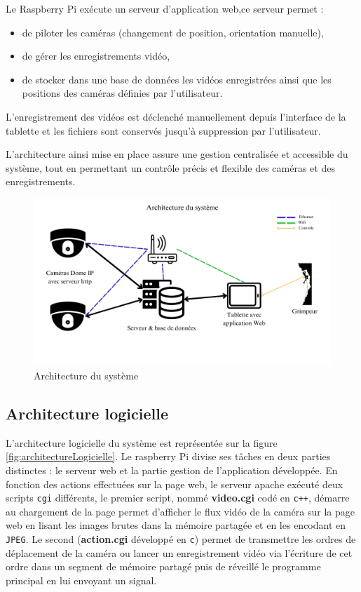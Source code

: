 \documentclass[a4paper, 11pt, french]{article}
\begin{document}
Le Raspberry Pi exécute un serveur d’application web,ce serveur permet :
\begin{itemize}
    \item de piloter les caméras (changement de position, orientation manuelle),
    \item de gérer les enregistrements vidéo,
    \item de stocker dans une base de données les vidéos enregistrées ainsi que les positions des caméras définies par l’utilisateur.
\end{itemize}

L’enregistrement des vidéos est déclenché manuellement depuis l’interface de la tablette et les fichiers sont conservés jusqu’à suppression par l’utilisateur.

L’architecture ainsi mise en place assure une gestion centralisée et accessible du système, tout en permettant un contrôle précis et flexible des caméras et des enregistrements.


\begin{figure}[!ht]
  \centering
  \includegraphics[width=\textwidth]{architectureMaterielle.png}
  \caption{Architecture du système}
  \label{fig:architecture}
\end{figure}

\subsection{Architecture logicielle}
L'architecture logicielle du système est représentée sur la figure \ref{fig:architectureLogicielle}. Le raspberry Pi divise ses tâches en deux parties distinctes : le serveur web et la partie gestion de l'application développée. En fonction des actions effectuées sur la page web, le serveur apache exécuté deux scripts \texttt{cgi} différents, le premier script, nommé \textbf{video.cgi} codé en \texttt{c++}, démarre au chargement de la page permet d'afficher le flux vidéo de la caméra sur la page web en lisant les images brutes dans la mémoire partagée et en les encodant en \texttt{JPEG}. Le second (\textbf{action.cgi} développé en \texttt{c}) permet de transmettre les ordres de déplacement de la caméra ou lancer un enregistrement vidéo via l'écriture de cet ordre dans un segment de mémoire partagé puis de réveillé le programme principal en lui envoyant un signal. 
\end{document}
